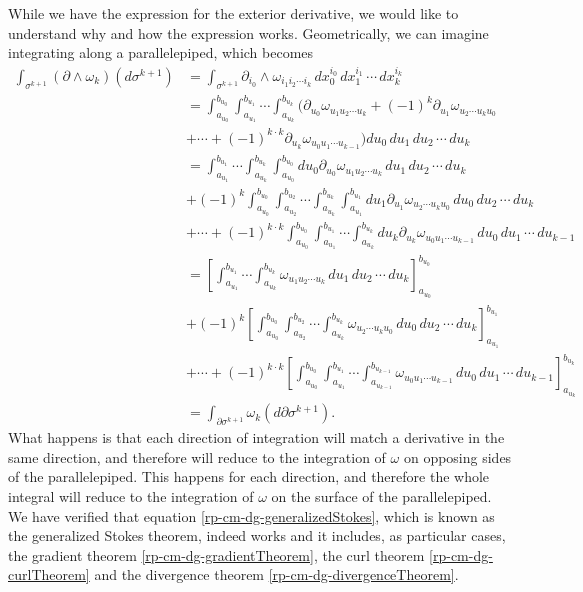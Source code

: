 While we have the expression for the exterior derivative, we would like to understand why and how the expression works. Geometrically, we can imagine integrating along a parallelepiped, which becomes
\begingroup
\allowdisplaybreaks
\begin{align*}
		\int_{\sigma^{k+1}} (\partial \wedge \omega_k) (d\sigma^{k+1}) &= \int_{\sigma^{k+1}} \partial_{i_0} \wedge \omega_{i_1 i_2 \cdots i_k} \, dx_0^{i_0} \, dx_1^{i_1} \, \cdots \, dx_k^{i_k} \\
		&= \int_{a_{u_0}}^{b_{u_0}} \int_{a_{u_1}}^{b_{u_1}} \cdots \int_{a_{u_k}}^{b_{u_k}} (\partial_{u_0} \omega_{u_1 u_2 \cdots u_k} + (-1)^{k} \partial_{u_1} \omega_{u_2 \cdots u_k u_0} \\
		&+ \cdots 
		+ (-1)^{k \cdot k} \partial_{u_k} \omega_{u_0 u_1 \cdots u_{k-1}} )du_0 \,du_1 \, du_2 \, \cdots \, du_k \\
		&= \int_{a_{u_1}}^{b_{u_1}} \cdots \int_{a_{u_k}}^{b_{u_k}} \int_{a_{u_0}}^{b_{u_0}} du_0 \partial_{u_0} \omega_{u_1 u_2 \cdots u_k} \,du_1 \, du_2 \, \cdots \, du_k \\
		&+ (-1)^{k} \int_{a_{u_0}}^{b_{u_0}} \int_{a_{u_2}}^{b_{u_2}} \cdots \int_{a_{u_k}}^{b_{u_k}} \int_{a_{u_1}}^{b_{u_1}} du_1 \partial_{u_1}  \omega_{u_2 \cdots u_k u_0} \,du_0 \, du_2 \, \cdots \, du_k \\
		&+ \cdots + (-1)^{k \cdot k} \int_{a_{u_0}}^{b_{u_0}} \int_{a_{u_1}}^{b_{u_1}} \cdots \int_{a_{u_{k}}}^{b_{u_k}} du_k  \partial_{u_k} \omega_{u_0 u_1 \cdots u_{k-1}} \,du_0 \, du_1 \, \cdots \, du_{k-1} \\
		&= \left[ \int_{a_{u_1}}^{b_{u_1}} \cdots \int_{a_{u_k}}^{b_{u_k}} \omega_{u_1 u_2 \cdots u_k} \,du_1 \, du_2 \, \cdots \, du_k \right]_{a_{u_0}}^{b_{u_0}} \\
		&+ (-1)^{k} \left[ \int_{a_{u_0}}^{b_{u_0}} \int_{a_{u_2}}^{b_{u_2}} \cdots \int_{a_{u_k}}^{b_{u_k}}\omega_{u_2 \cdots u_k u_0} \,du_0 \, du_2 \, \cdots \, du_k \right]_{a_{u_1}}^{b_{u_1}} \\
		&+ \cdots + (-1)^{k \cdot k} \left[ \int_{a_{u_0}}^{b_{u_0}} \int_{a_{u_1}}^{b_{u_1}} \cdots \int_{a_{u_{k-1}}}^{b_{u_{k-1}}} \omega_{u_0 u_1 \cdots u_{k-1}} \,du_0 \, du_1 \, \cdots \, du_{k-1} \right]_{a_{u_{k}}}^{b_{u_k}} \\
		&= \int_{\partial \sigma^{k+1}} \omega_k (d\partial\sigma^{k+1}).
\end{align*}
\endgroup
What happens is that each direction of integration will match a derivative in the same direction, and therefore will reduce to the integration of $\omega$ on opposing sides of the parallelepiped. This happens for each direction, and therefore the whole integral will reduce to the integration of $\omega$ on the surface of the parallelepiped. We have verified that equation \ref{rp-cm-dg-generalizedStokes}, which is known as the generalized Stokes theorem, indeed works and it includes, as particular cases, the gradient theorem \ref{rp-cm-dg-gradientTheorem}, the curl theorem \ref{rp-cm-dg-curlTheorem} and the divergence theorem \ref{rp-cm-dg-divergenceTheorem}.

